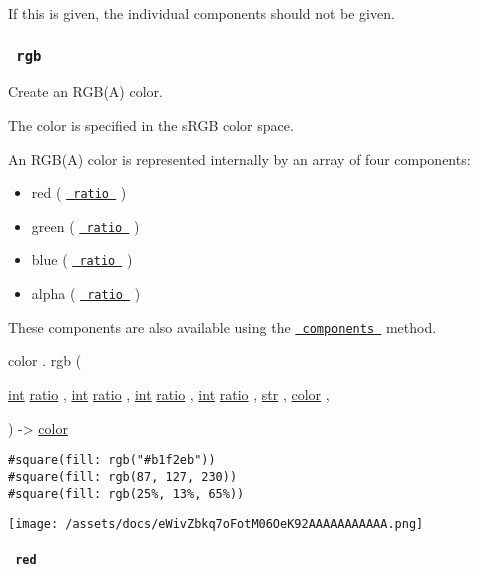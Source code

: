 If this is given, the individual components should not be given.

\subsubsection{\texorpdfstring{\texttt{\ rgb\ }}{ rgb }}\label{definitions-rgb}

Create an RGB(A) color.

The color is specified in the sRGB color space.

An RGB(A) color is represented internally by an array of four
components:

\begin{itemize}
\tightlist
\item
  red ( \href{/docs/reference/layout/ratio/}{\texttt{\ ratio\ }} )
\item
  green ( \href{/docs/reference/layout/ratio/}{\texttt{\ ratio\ }} )
\item
  blue ( \href{/docs/reference/layout/ratio/}{\texttt{\ ratio\ }} )
\item
  alpha ( \href{/docs/reference/layout/ratio/}{\texttt{\ ratio\ }} )
\end{itemize}

These components are also available using the
\href{/docs/reference/visualize/color/\#definitions-components}{\texttt{\ components\ }}
method.

color { . } { rgb } (

{ \href{/docs/reference/foundations/int/}{int}
\href{/docs/reference/layout/ratio/}{ratio} , } {
\href{/docs/reference/foundations/int/}{int}
\href{/docs/reference/layout/ratio/}{ratio} , } {
\href{/docs/reference/foundations/int/}{int}
\href{/docs/reference/layout/ratio/}{ratio} , } {
\href{/docs/reference/foundations/int/}{int}
\href{/docs/reference/layout/ratio/}{ratio} , } {
\href{/docs/reference/foundations/str/}{str} , } {
\href{/docs/reference/visualize/color/}{color} , }

) -\textgreater{} \href{/docs/reference/visualize/color/}{color}

\begin{verbatim}
#square(fill: rgb("#b1f2eb"))
#square(fill: rgb(87, 127, 230))
#square(fill: rgb(25%, 13%, 65%))
\end{verbatim}

\texttt{[image: /assets/docs/eWivZbkq7oFotM06OeK92AAAAAAAAAAA.png]}

\paragraph{\texorpdfstring{\texttt{\ red\ }}{ red }}\label{definitions-rgb-red}

